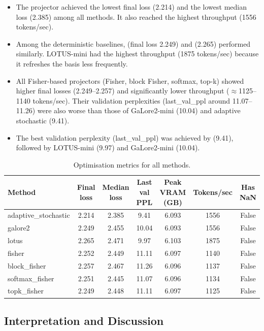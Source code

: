 \documentclass[conference]{IEEEtran}
\begin{document}
\begin{itemize}
    \item The  projector achieved the lowest final loss (2.214) and the lowest median loss (2.385) among all methods. It also reached the highest throughput (1556 tokens/sec).
    \item Among the deterministic baselines,  (final loss 2.249) and  (2.265) performed similarly. LOTUS-mini had the highest throughput (1875 tokens/sec) because it refreshes the basis less frequently.
    \item All Fisher-based projectors (Fisher, block Fisher, softmax, top-k) showed higher final losses (2.249--2.257) and significantly lower throughput ($\approx$1125--1140 tokens/sec). Their validation perplexities (last\_val\_ppl around 11.07--11.26) were also worse than those of GaLore2-mini (10.04) and adaptive stochastic (9.41).
    \item The best validation perplexity (last\_val\_ppl) was achieved by  (9.41), followed by LOTUS-mini (9.97) and GaLore2-mini (10.04).
\end{itemize}

\begin{table}[t]
\caption{Optimisation metrics for all methods.}
\centering
\begin{tabular}{lcccccc}
\toprule
Method & Final loss & Median loss & Last val PPL & Peak VRAM (GB) & Tokens/sec & Has NaN \\
\midrule
adaptive\_stochastic & 2.214 & 2.385 & 9.41 & 6.093 & 1556 & False \\
galore2 & 2.249 & 2.455 & 10.04 & 6.093 & 1556 & False \\
lotus & 2.265 & 2.471 & 9.97 & 6.103 & 1875 & False \\
fisher & 2.252 & 2.449 & 11.11 & 6.097 & 1140 & False \\
block\_fisher & 2.257 & 2.467 & 11.26 & 6.096 & 1137 & False \\
softmax\_fisher & 2.251 & 2.445 & 11.07 & 6.096 & 1134 & False \\
topk\_fisher & 2.249 & 2.448 & 11.11 & 6.097 & 1125 & False \\
\bottomrule
\end{tabular}
\label{tab:loss}
\end{table}

\subsection{Interpretation and Discussion}
\end{document}
